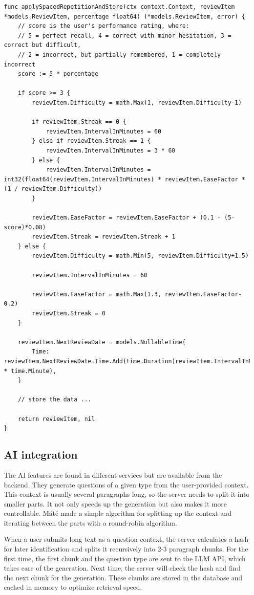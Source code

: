 \begin{lstlisting}[caption=Spaced repetition algorithm written in Go,label=lst:spaced-repetition]
func applySpacedRepetitionAndStore(ctx context.Context, reviewItem *models.ReviewItem, percentage float64) (*models.ReviewItem, error) {
	// score is the user's performance rating, where:
	// 5 = perfect recall, 4 = correct with minor hesitation, 3 = correct but difficult,
	// 2 = incorrect, but partially remembered, 1 = completely incorrect
	score := 5 * percentage

	if score >= 3 {
		reviewItem.Difficulty = math.Max(1, reviewItem.Difficulty-1)

		if reviewItem.Streak == 0 {
			reviewItem.IntervalInMinutes = 60
		} else if reviewItem.Streak == 1 {
			reviewItem.IntervalInMinutes = 3 * 60
		} else {
			reviewItem.IntervalInMinutes = int32(float64(reviewItem.IntervalInMinutes) * reviewItem.EaseFactor * (1 / reviewItem.Difficulty))
		}

		reviewItem.EaseFactor = reviewItem.EaseFactor + (0.1 - (5-score)*0.08)
		reviewItem.Streak = reviewItem.Streak + 1
	} else {
		reviewItem.Difficulty = math.Min(5, reviewItem.Difficulty+1.5)

		reviewItem.IntervalInMinutes = 60

		reviewItem.EaseFactor = math.Max(1.3, reviewItem.EaseFactor-0.2)
		reviewItem.Streak = 0
	}

	reviewItem.NextReviewDate = models.NullableTime{
		Time: reviewItem.NextReviewDate.Time.Add(time.Duration(reviewItem.IntervalInMinutes) * time.Minute),
	}

	// store the data ...

	return reviewItem, nil
}
\end{lstlisting}

\subsection{AI integration}

The AI features are found in different services but are available from the backend. They generate questions of a given type from the user-provided context. This context is usually several paragraphs long, so the server needs to split it into smaller parts. It not only speeds up the generation but also makes it more controllable. Máté made a simple algorithm for splitting up the context and iterating between the parts with a round-robin algorithm.

When a user submits long text as a question context, the server calculates a hash for later identification and splits it recursively into 2-3 paragraph chunks. For the first time, the first chunk and the question type are sent to the LLM API, which takes care of the generation. Next time, the server will check the hash and find the next chunk for the generation. These chunks are stored in the database and cached in memory to optimize retrieval speed.

